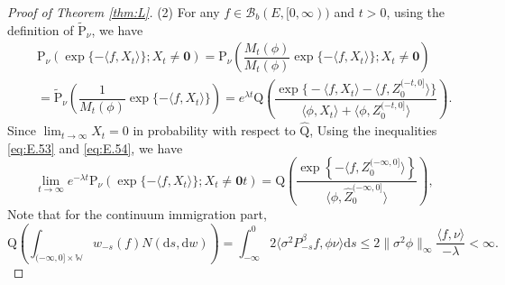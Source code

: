 \documentclass[12pt,a4paper]{amsart}
\numberwithin{equation}{section}
\theoremstyle{plain}
\theoremstyle{definition}
\theoremstyle{remark}
\begin{document}
\begin{proof}[Proof of Theorem \ref{thm:L}]
(2) 
For any $f\in\mathcal B_b(E, [0, \infty))$ and $t>0$,  using the definition of $\widetilde{\mathrm P}_\nu$, we have
\begin{eqnarray*}
&&\mathrm P_\nu\left(\exp\{-\langle f, X_t\rangle \}; X_t\neq \mathbf 0\right)
=\mathrm P_\nu\left(\dfrac{M_t(\phi)}{M_t(\phi)}\exp\{-\langle f, X_t\rangle \};X_t\neq \mathbf 0\right)\\
&&=\widetilde{\mathrm P}_\nu\left(\dfrac{1}{M_t(\phi)}\exp\{-\langle f, X_t\rangle \}\right)
=e^{\lambda t}\mathrm Q\left(\dfrac{\exp\Big\{-\langle f, X_t\rangle -\langle f,  Z_0^{(-t, 0]}\rangle\Big \}}{\langle\phi, X_t\rangle +\langle\phi,  Z_0^{(-t, 0]}\rangle }\right).
\end{eqnarray*}
Since $\lim_{t\rightarrow\infty}X_t=0$ in probability with respect to 
$\widehat{\mathrm Q}$,
Using the inequalities  \eqref{eq:E.53} and  \eqref{eq:E.54}, we have
\[
\lim_{t\to\infty}e^{-\lambda t}\mathrm P_\nu\left(\exp\{-\langle f, X_t\rangle \};X_t\neq \mathbf 0t\right)={\mathrm Q}\left(\dfrac{\exp\left\{-\langle f,Z_0^{(-\infty, 0]}\rangle \right\}}{\langle \phi,\widehat Z_0^{(-\infty, 0]}\rangle}\right),
\]
Note that for the continuum immigration part,
\[
\mathrm Q\left(\int_{(-\infty, 0]\times \mathbb W}w_{-s}(f)N(\mathrm ds, \mathrm dw)\right)=
\int^0_{-\infty}2\langle \sigma^2 P^{\beta}_{-s}f,\phi\nu\rangle \mathrm ds
\leq 2\|\sigma^2\phi\|_\infty\dfrac{\langle f,\nu\rangle }{-\lambda}<\infty.
\]


\end{proof}
\end{document}

